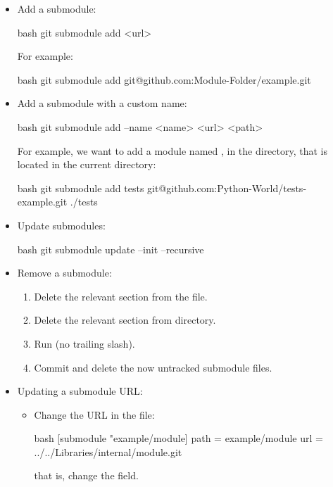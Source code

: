 \begin{itemize}
    \item Add a submodule:
    \begin{mintedbox}{bash}
git submodule add <url>
    \end{mintedbox}
    For example:
    \begin{mintedbox}{bash}
git submodule add git@github.com:Module-Folder/example.git
    \end{mintedbox}
    \item Add a submodule with a custom name:
    \begin{mintedbox}{bash}
git submodule add --name <name> <url> <path>
    \end{mintedbox}
    For example, we want to add a module named , in the
     directory, that is located in the current
    directory:
    \begin{mintedbox}{bash}
git submodule add tests git@github.com:Python-World/tests-example.git ./tests
    \end{mintedbox}
    \item Update submodules:
    \begin{mintedbox}{bash}
git submodule update --init --recursive
    \end{mintedbox}
    \item Remove a submodule:
    \begin{enumerate}
        \item Delete the relevant section from the  file.
        \item Delete the relevant section from  directory.
        \item Run  (no trailing slash).
        \item Commit and delete the now untracked submodule files.
    \end{enumerate}
    \item Updating a submodule URL:
    \begin{itemize}
        \item Change the URL in the  file:
        \begin{mintedbox}{bash}
[submodule "example/module]
    path = example/module
    url = ../../Libraries/internal/module.git
        \end{mintedbox}
        that is, change the  field.

\end{itemize}
\end{itemize}
